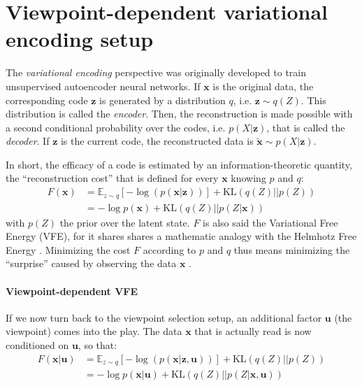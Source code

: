 \documentclass[12pt,twoside,openright]{article}
\begin{document}
\section{Viewpoint-dependent variational encoding setup}\label{app:VFE}

	The \emph{variational encoding} perspective \citep{hinton1994autoencoders} was originally developed 
	to train unsupervised autoencoder neural networks. 
	If $\boldsymbol{x}$ is the original data, the corresponding code $\boldsymbol{z}$ is generated by a distribution $q$, i.e. $\boldsymbol{z} \sim q(Z)$. This distribution is called the \emph{encoder}. Then, the reconstruction is made possible with a second conditional probability over the codes, i.e. $p(X|\boldsymbol{z})$, that is called the \emph{decoder}. If $\boldsymbol{z}$ is the current code, the reconstructed data is $\tilde{\boldsymbol{x}} \sim p(X|\boldsymbol{z})$. 
	
	In short, the efficacy of a code is estimated by an information-theoretic quantity, the ``reconstruction cost'' that is defined for every $\boldsymbol{x}$ knowing $p$ and $q$:
	\begin{align}
	F(\boldsymbol{x}) 
	&= \mathbb{E}_{z\sim q} \left[-\log (p(\boldsymbol{x}|\boldsymbol{z}))\right] +\text{KL}(q(Z)||p(Z))
	\label{eq:FEP-prior}\\
	&= - \log p(\boldsymbol{x}) + \text{KL}(q(Z)||p(Z|\boldsymbol{x}))
	\label{eq:FEP}
	\end{align}
	with $p(Z)$ the prior over the latent state.
	$F$ is also said the Variational Free Energy (VFE), for it shares shares a mathematic analogy with the Helmhotz Free Energy \citep{friston2010free}.
	Minimizing the cost $F$ according to $p$ and $q$ thus means minimizing the ``surprise'' caused by observing the data $\boldsymbol{x}$ \citep{friston2010free}.
	
	\paragraph{Viewpoint-dependent VFE}
	If we now turn back to the viewpoint selection setup, an additional factor $\boldsymbol{u}$ (the viewpoint) comes into the play. The data $\boldsymbol{x}$ that is actually read is now conditioned on  $\boldsymbol{u}$, so that:
	\begin{align}
	F(\boldsymbol{x}|\boldsymbol{u}) 
	&= \mathbb{E}_{z\sim q} \left[-\log (p(\boldsymbol{x}|\boldsymbol{z},\boldsymbol{u}))\right] +\text{KL}(q(Z)||p(Z))
	\label{eq:FEP-prior-u-app}\\
	&= - \log p(\boldsymbol{x}|\boldsymbol{u}) + \text{KL}(q(Z)||p(Z|\boldsymbol{x}, \boldsymbol{u}))
	\label{eq:FEP-posterior-u-app}\end{align}
\end{document}
